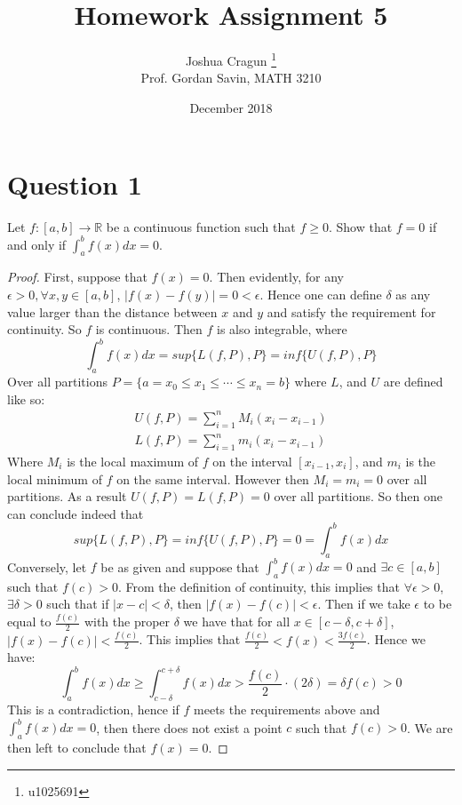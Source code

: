 \documentclass[12pt, letterpaper]{article}
\title{Homework Assignment 5}
\author{Joshua Cragun \thanks{u1025691} \\ Prof. Gordan Savin, MATH 3210}
\date{December 2018}
\begin{document}
\begin{titlepage}
\maketitle
\end{titlepage}

\section*{Question 1}
Let $f: [a,b] \rightarrow \mathbb R$ be a continuous function such that $f\geq 0$. Show that $f=0$ if and only if $\int_a^b f(x) dx=0$.

\begin{proof}
  First, suppose that $f(x) = 0$. Then evidently, for any $\epsilon > 0, \forall x, y \in [a,b]$, $|f(x) - f(y)| = 0 < \epsilon$. Hence one can define $\delta$ as any value larger than the distance between $x$ and $y$ and satisfy the requirement for continuity. So $f$ is continuous. Then $f$ is also integrable, where
  $$ \int_{a}^{b}f(x)dx = sup\{L(f,P), P\} = inf\{U(f, P), P\} $$
  Over all partitions $P = \{ a = x_0 \leq x_1 \leq \cdots \leq x_n = b \}$ where $L$, and $U$ are defined like so:
  \begin{align*}
    U(f, P) = \sum_{i=1}^{n} M_i(x_i - x_{i-1})\\
    L(f, P) = \sum_{i=1}^{n} m_i(x_i - x_{i-1})
  \end{align*}
  Where $M_i$ is the local maximum of $f$ on the interval $[x_{i-1}, x_i]$, and $m_i$ is the local minimum of $f$ on the same interval. However then $M_i = m_i = 0$ over all partitions. As a result $U(f, P) = L(f, P) = 0$ over all partitions.
  So then one can conclude indeed that
  $$ sup\{L(f,P), P\} = inf\{U(f, P), P\} = 0 = \int_{a}^{b}f(x)dx $$
  Conversely, let $f$ be as given and suppose that $\int_{a}^{b}f(x)dx = 0$ and $\exists c \in [a,b]$ such that $f(c) > 0$. From the definition of continuity, this implies that $\forall \epsilon > 0$, $\exists \delta > 0$ such that
  if $|x - c| < \delta$, then $|f(x) - f(c)| < \epsilon$. Then if we take $\epsilon$ to be equal to $\frac{f(c)}{2}$ with the proper $\delta$ we have that for all $x \in [c - \delta, c+\delta]$, $|f(x) - f(c)| < \frac{f(c)}{2}$.
  This implies that $\frac{f(c)}{2} < f(x) < \frac{3f(c)}{2} $. Hence we have:
  $$ \int_{a}^{b}f(x)dx \geq \int_{c - \delta}^{c+\delta}f(x)dx > \frac{f(c)}{2} \cdot (2\delta) = \delta f(c) > 0$$
  This is a contradiction, hence if $f$ meets the requirements above and $\int_{a}^{b}f(x)dx = 0$, then there does not exist a point $c$ such that $f(c) > 0$. We are then left to conclude that $f(x) = 0$.
\end{proof}
\end{document}
